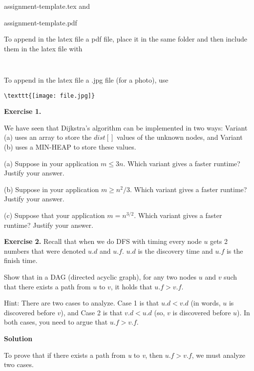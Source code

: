 \documentclass[11pt]{article}
\begin{document}
\begin{enumerate}
           assignment-template.tex	and
           
          assignment-template.pdf


To append in the  latex file  a pdf file, place it  in the same folder and then include them  in the latex file with 
\begin{verbatim}


\end{verbatim}
To append in the  latex file a .jpg file (for a photo), use 
\begin{verbatim}
\texttt{[image: file.jpg]}

\end{verbatim}


\end{enumerate}
\newpage


\textbf{Exercise 1.}

We have seen that Dijkstra's algorithm can be implemented in two ways: Variant (a) uses an array to store the $dist[]$ values of the unknown nodes, and Variant (b) uses a MIN-HEAP to store these values.
\medskip

(a) Suppose in your application $m \le 3n$. Which variant gives a faster runtime?  Justify your answer.


(b) Suppose in your application $m \ge n^2/3$. Which variant gives a faster runtime?  Justify your answer.

(c) Suppose that your application $m = n^{3/2}$.   Which variant gives a faster runtime?  Justify your answer.

\bigskip


\textbf{Exercise 2.}   Recall that when we do DFS with timing every node $u$ gets 2 numbers that were denoted $u.d$ and $u.f$.   $u.d$ is the discovery time and $u.f$ is the finish time.   

Show that in a DAG (directed acyclic graph),  for any two nodes $u$ and $v$ such that there exists a path from $u$ to $v$, it holds that $u.f > v. f$.

Hint: There are two cases to analyze. Case 1 is that $u.d < v.d$ (in words, $u$ is discovered before $v$), and Case 2 is that $v.d < u.d$ (so, $v$ is discovered before $u$). In both cases, you need to argue that $u.f > v.f$.
\bigskip

\textbf{Solution}

    To prove that if there exists a path from \textit{u} to \textit{v}, then $u.f > v.f$, we must analyze two cases. 
    
\end{document}
